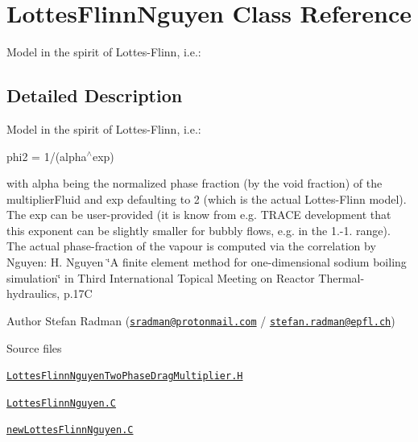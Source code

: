 \hypertarget{classFoam_1_1LottesFlinnNguyen}{}\section{Lottes\+Flinn\+Nguyen Class Reference}
\label{classFoam_1_1LottesFlinnNguyen}


Model in the spirit of Lottes-\/\+Flinn, i.\+e.\+:  




\subsection{Detailed Description}
Model in the spirit of Lottes-\/\+Flinn, i.\+e.\+: 

\label{_Description}%
 phi2 = 1/(alpha$^\wedge$exp)

with alpha being the normalized phase fraction (by the void fraction) of the multiplier\+Fluid and exp defaulting to 2 (which is the actual Lottes-\/\+Flinn model). The exp can be user-\/provided (it is know from e.\+g. T\+R\+A\+CE development that this exponent can be slightly smaller for bubbly flows, e.\+g. in the 1.-\/1. range). The actual phase-\/fraction of the vapour is computed via the correlation by Nguyen\+: H. Nguyen \char`\"{}\+A finite element method for one-\/dimensional sodium boiling
simulation\char`\"{} in Third International Topical Meeting on Reactor Thermal-\/hydraulics, p.\+17C

Author Stefan Radman (\href{mailto:sradman@protonmail.com}{\tt sradman@protonmail.\+com} / \href{mailto:stefan.radman@epfl.ch}{\tt stefan.\+radman@epfl.\+ch})

\begin{DoxyParagraph}{Source files}

\begin{DoxyItemize}
\item \href{../../../home/carlo/data/GeN-Foam/GeN-Foam_ffn/GeN-Foam/GeN-Foam/classes/thermalHydraulics/src/physicsModels/dragModels/twoPhaseDragMultiplierModels/LottesFlinnNguyen/LottesFlinnNguyenTwoPhaseDragMultiplier.H}{\tt Lottes\+Flinn\+Nguyen\+Two\+Phase\+Drag\+Multiplier.\+H} 
\item \href{../../../home/carlo/data/GeN-Foam/GeN-Foam_ffn/GeN-Foam/GeN-Foam/classes/thermalHydraulics/src/physicsModels/dragModels/twoPhaseDragMultiplierModels/LottesFlinnNguyen/LottesFlinnNguyen.C}{\tt Lottes\+Flinn\+Nguyen.\+C} 
\item \href{../../../home/carlo/data/GeN-Foam/GeN-Foam_ffn/GeN-Foam/GeN-Foam/classes/thermalHydraulics/src/physicsModels/dragModels/twoPhaseDragMultiplierModels/LottesFlinnNguyen/newLottesFlinnNguyen.C}{\tt new\+Lottes\+Flinn\+Nguyen.\+C} 
\end{DoxyItemize}
\end{DoxyParagraph}


